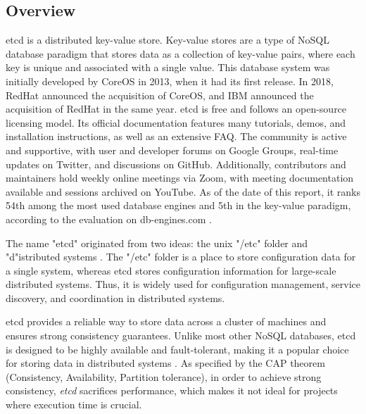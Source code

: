 \documentclass[screen,review]{acmart}
\begin{document}
\subsection{Overview}
etcd is a distributed key-value store. Key-value stores are a type of NoSQL database paradigm that stores data as a collection of key-value pairs, where each key is unique and associated with a single value.
This database system was initially developed by CoreOS in 2013, when it had its first release. In 2018, RedHat announced the acquisition of CoreOS, and IBM announced the acquisition of RedHat in the same year.
etcd is free and follows an open-source licensing model. Its official documentation features many tutorials, demos, and installation instructions, as well as an extensive FAQ. The community is active and supportive, with user and developer forums on Google Groups, real-time updates on Twitter, and discussions on GitHub. Additionally, contributors and maintainers hold weekly online meetings via Zoom, with meeting documentation available and sessions archived on YouTube. As of the date of this report, it ranks 54th among the most used database engines and 5th in the key-value paradigm, according to the evaluation on db-engines.com \cite{db-engines}.

The name "etcd" originated from two ideas: the unix "/etc" folder and "d"istributed systems \cite{dbdb}. The "/etc" folder is a place to store configuration data for a single system, whereas etcd stores configuration information for large-scale distributed systems. Thus, it is widely used for configuration management, service discovery, and coordination in distributed systems.

etcd provides a reliable way to store data across a cluster of machines and ensures strong consistency guarantees. Unlike most other NoSQL databases, etcd is designed to be highly available and fault-tolerant, making it a popular choice for storing data in distributed systems \cite{ibm} \cite{etcd_overview}. As specified by the CAP theorem \cite{ibm_CAP} (Consistency, Availability, Partition tolerance), in order to achieve strong consistency, \textit{etcd} sacrifices performance, which makes it not ideal for projects where execution time is crucial.
\end{document}
